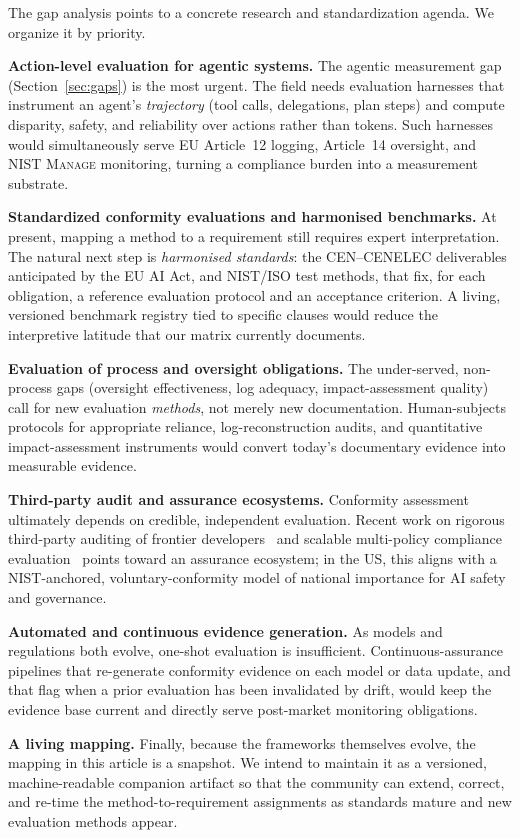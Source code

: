 The gap analysis points to a concrete research and standardization agenda. We organize it
by priority.

\textbf{Action-level evaluation for agentic systems.} The agentic measurement gap
(Section~\ref{sec:gaps}) is the most urgent. The field needs evaluation harnesses that
instrument an agent's \emph{trajectory} (tool calls, delegations, plan steps) and
compute disparity, safety, and reliability over actions rather than tokens. Such
harnesses would simultaneously serve EU Article~12 logging, Article~14 oversight, and
NIST \textsc{Manage} monitoring, turning a compliance burden into a measurement
substrate.

\textbf{Standardized conformity evaluations and harmonised benchmarks.} At present,
mapping a method to a requirement still requires expert interpretation. The natural next
step is \emph{harmonised standards}: the CEN--CENELEC deliverables anticipated by the EU
AI Act, and NIST/ISO test methods, that fix, for each obligation, a reference evaluation
protocol and an acceptance criterion. A living, versioned benchmark registry tied to
specific clauses would reduce the interpretive latitude that our matrix currently
documents.

\textbf{Evaluation of process and oversight obligations.} The under-served, non-process
gaps (oversight effectiveness, log adequacy, impact-assessment quality) call for new
evaluation \emph{methods}, not merely new documentation. Human-subjects protocols for
appropriate reliance, log-reconstruction audits, and quantitative impact-assessment
instruments would convert today's documentary evidence into measurable evidence.

\textbf{Third-party audit and assurance ecosystems.} Conformity assessment ultimately
depends on credible, independent evaluation. Recent work on rigorous third-party auditing
of frontier developers~\cite{auditing2024frontier} and scalable multi-policy compliance
evaluation~\cite{compliance2025pasta} points toward an assurance ecosystem; in the US,
this aligns with a NIST-anchored, voluntary-conformity model of national importance for
AI safety and governance.

\textbf{Automated and continuous evidence generation.} As models and regulations both
evolve, one-shot evaluation is insufficient. Continuous-assurance pipelines that
re-generate conformity evidence on each model or data update, and that flag when a prior
evaluation has been invalidated by drift, would keep the evidence base current and
directly serve post-market monitoring obligations.

\textbf{A living mapping.} Finally, because the frameworks themselves evolve, the mapping
in this article is a snapshot. We intend to maintain it as a versioned, machine-readable
companion artifact so that the community can extend, correct, and re-time the
method-to-requirement assignments as standards mature and new evaluation methods appear.

